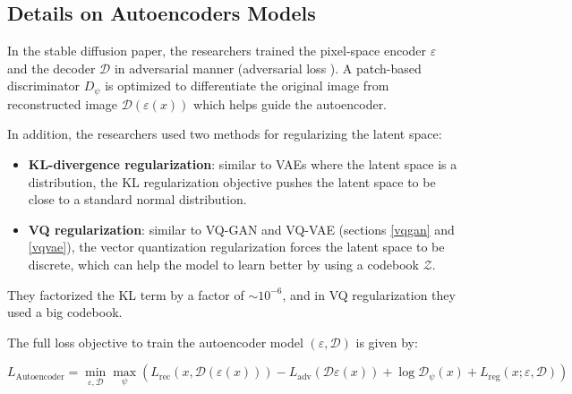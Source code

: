 









\subsection{Details on Autoencoders Models}

In the stable diffusion paper, the researchers trained the pixel-space encoder $\varepsilon$ and the decoder $\mathcal{D}$ in adversarial manner (adversarial loss \cite{vqgan}). A patch-based discriminator $D_\psi$ is optimized to differentiate the original image from reconstructed image $\mathcal{D} (\varepsilon (x))$ which helps guide the autoencoder.

In addition, the researchers used two methods for regularizing the latent space:

\begin{itemize}
    \item \textbf{KL-divergence regularization}: similar to VAEs where the latent space is a distribution, the KL regularization objective pushes the latent space to be close to a standard normal distribution.
    \item \textbf{VQ regularization}: similar to VQ-GAN and VQ-VAE (sections \ref{vqgan} and \ref{vqvae}), the vector quantization regularization forces the latent space to be discrete, which can help the model to learn better by using a codebook $\mathcal{Z}$.
\end{itemize}

They factorized the KL term by a factor of $\sim 10^{-6}$, and in VQ regularization they used a big codebook.

The full loss objective to train the autoencoder model $(\varepsilon, \mathcal{D})$ is given by:

\begin{equation*}
    L_{\text{Autoencoder}} = \min_{\varepsilon, \mathcal{D}} \max_{\psi} \left( L_{\text{rec}} (x, \mathcal{D} (\varepsilon (x))) - L_{\text{adv}} (\mathcal{D} \varepsilon (x)) + \log \mathcal{D}_\psi (x) + L_{\text{reg}} (x; \varepsilon, \mathcal{D}) \right)
\end{equation*}


















